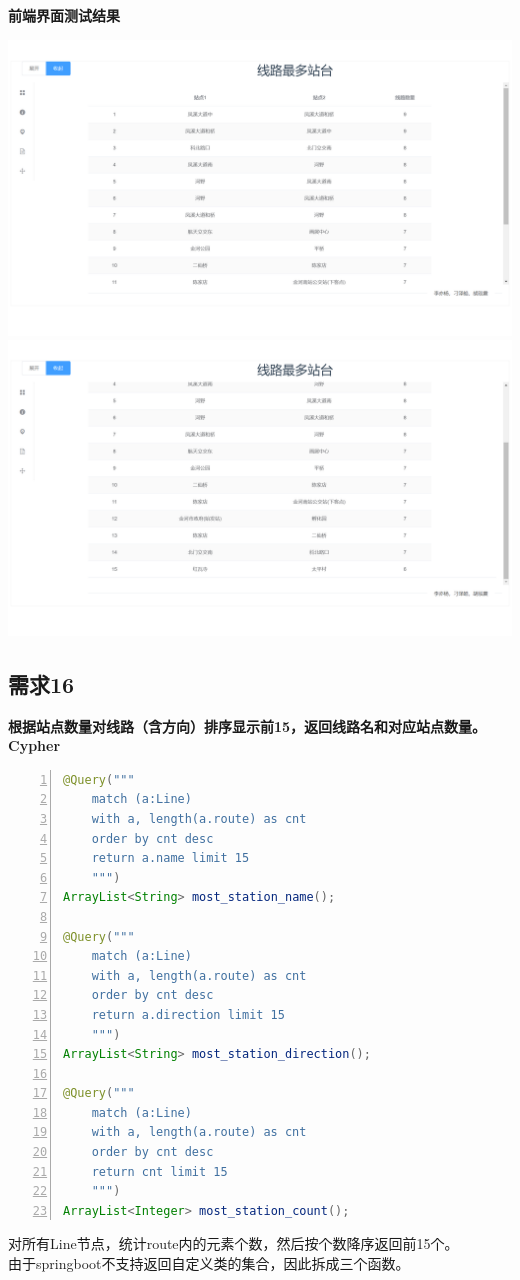 \documentclass[11pt,a4paper]{article}
\begin{document}
\textbf{前端界面测试结果} \\
\begin{center}
\centering
\includegraphics[scale=0.3]{./assets/demand15_1.png} \\ 
\includegraphics[scale=0.3]{./assets/demand15_2.png} 
\end{center}

\subsection{需求16}
\textbf{根据站点数量对线路（含方向）排序显示前15，返回线路名和对应站点数量。} \\
\textbf{Cypher} \\
\begin{lstlisting}[numbers = left, 
showstringspaces=false,
showspaces = false,
breaklines = true, 
language=Java]
@Query("""
	match (a:Line)
	with a, length(a.route) as cnt
	order by cnt desc
	return a.name limit 15
	""")
ArrayList<String> most_station_name();

@Query("""
	match (a:Line)
	with a, length(a.route) as cnt
	order by cnt desc
	return a.direction limit 15
	""")
ArrayList<String> most_station_direction();

@Query("""
	match (a:Line)
	with a, length(a.route) as cnt
	order by cnt desc
	return cnt limit 15
	""")
ArrayList<Integer> most_station_count();
\end{lstlisting} 
对所有Line节点，统计route内的元素个数，然后按个数降序返回前15个。\\
由于springboot不支持返回自定义类的集合，因此拆成三个函数。
\end{document}
